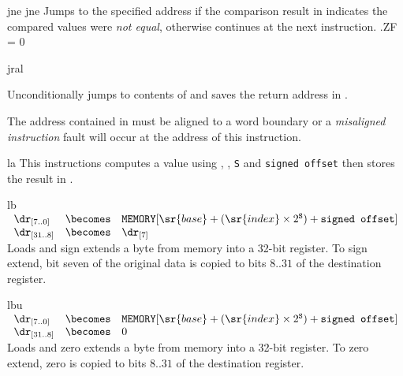 \begin{instruction}{jne}
  \jumptype
     {jne}
     {\jjneopc}
     {Jumps to the specified address if the comparison result in 
       indicates the compared values were \emph{not equal}, otherwise continues
       at the next instruction.}
     {.ZF = 0}
\end{instruction}


\begin{instruction}{jral}\label{inst:jral}
  \jraltype
      {Unconditionally jumps to contents of  and saves the
        return address in \dr.

        The address contained in  must be aligned to a word
        boundary or a \emph{misaligned instruction} fault will
        occur at the address of this instruction.}
\end{instruction}


\begin{instruction}{la}
     {\laopc}
     {
       This instructions computes a value using , ,
       \texttt{S} and \texttt{signed offset} then stores the
       result in \dr.
     }
\end{instruction}


\begin{instruction}{lb}
     {\lbopc}
     {
       \begin{math}
         \begin{array}{lcl}
           {\dr}_{[7..0]} & \becomes & \texttt{MEMORY}[\sr{base} +
            (\sr{index} \times 2^{\texttt{S}}) + \texttt{signed offset}] \\
           {\dr}_{[31..8]} & \becomes & {\dr}_{[7]} \\
         \end{array}
       \end{math}
     }
     {
       Loads and sign extends a byte from memory into a 32-bit
       register.  To sign extend, bit seven of the original data
       is copied to bits ${8..31}$ of the destination register.
     }
\end{instruction}

\begin{instruction}{lbu}
     {\lbuopc}
     {
       \begin{math}
         \begin{array}{lcl}
           {\dr}_{[7..0]} & \becomes & \texttt{MEMORY}[\sr{base} +
            (\sr{index} \times 2^{\texttt{S}}) + \texttt{signed offset}] \\
           {\dr}_{[31..8]} & \becomes & 0 \\
         \end{array}
       \end{math}
     }
     {
       Loads and zero extends a byte from memory into a 32-bit
       register.  To zero extend, zero is copied to bits ${8..31}$
       of the destination register.
     }
\end{instruction}


